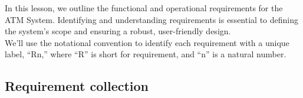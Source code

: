 

In this lesson, we outline the functional and operational requirements for the ATM System. Identifying and understanding requirements is essential to defining the system's scope and ensuring a robust, user-friendly design.
\\
We'll use the notational convention to identify each requirement with a unique label, ``Rn,'' where ``R'' is short for requirement, and ``n'' is a natural number.

\subsection{Requirement collection}\label{l26NQTUTc4yL2-Ol9v6FB}

